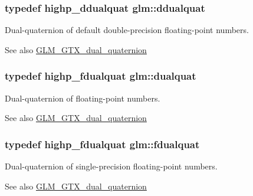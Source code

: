 \subsubsection[{ddualquat}]{\setlength{\rightskip}{0pt plus 5cm}typedef highp\+\_\+ddualquat {\bf glm\+::ddualquat}}\label{group__gtx__dual__quaternion_ga373431ffdd82d5c03c258217a9e1f1a6}
Dual-\/quaternion of default double-\/precision floating-\/point numbers.

\begin{DoxySeeAlso}{See also}
\hyperlink{group__gtx__dual__quaternion}{G\+L\+M\+\_\+\+G\+T\+X\+\_\+dual\+\_\+quaternion} 
\end{DoxySeeAlso}
\hypertarget{group__gtx__dual__quaternion_ga2f6227b5f9dc08a2e7682065a84b3aa9}{}
\subsubsection[{dualquat}]{\setlength{\rightskip}{0pt plus 5cm}typedef highp\+\_\+fdualquat {\bf glm\+::dualquat}}\label{group__gtx__dual__quaternion_ga2f6227b5f9dc08a2e7682065a84b3aa9}
Dual-\/quaternion of floating-\/point numbers.

\begin{DoxySeeAlso}{See also}
\hyperlink{group__gtx__dual__quaternion}{G\+L\+M\+\_\+\+G\+T\+X\+\_\+dual\+\_\+quaternion} 
\end{DoxySeeAlso}
\hypertarget{group__gtx__dual__quaternion_ga436906129bc69ca5059555cafcbac9fd}{}
\subsubsection[{fdualquat}]{\setlength{\rightskip}{0pt plus 5cm}typedef highp\+\_\+fdualquat {\bf glm\+::fdualquat}}\label{group__gtx__dual__quaternion_ga436906129bc69ca5059555cafcbac9fd}
Dual-\/quaternion of single-\/precision floating-\/point numbers.

\begin{DoxySeeAlso}{See also}
\hyperlink{group__gtx__dual__quaternion}{G\+L\+M\+\_\+\+G\+T\+X\+\_\+dual\+\_\+quaternion} 
\end{DoxySeeAlso}
\hypertarget{group__gtx__dual__quaternion_ga83e4c5d27c8b0a264a3f3aed24f3f84e}{}
